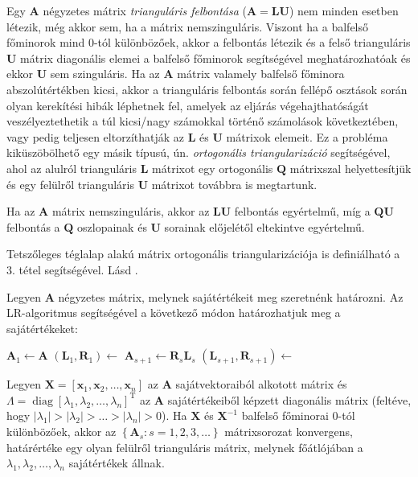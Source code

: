 \documentclass[DIV=15,appendixprefix]{scrreprt}
\theoremstyle{definition}
\theoremstyle{remark}
\DeclareMathOperator{\T}{T}
\DeclareMathOperator{\diag}{diag}
\begin{document}
Egy $ \mathbf{ A } $ négyzetes mátrix \emph{trianguláris felbontása} ($ \mathbf{ A } = \mathbf{ L }
\mathbf{ U } $) nem minden esetben létezik, még akkor sem, ha a mátrix nemszinguláris. Viszont ha a
balfelső főminorok mind 0-tól különbözőek, akkor a felbontás létezik és a felső trianguláris
$ \mathbf{ U } $ mátrix diagonális elemei a balfelső főminorok segítségével meghatározhatóak és
ekkor $ \mathbf{ U } $ sem szinguláris. Ha az $ \mathbf{ A } $ mátrix valamely balfelső főminora
abszolútértékben kicsi, akkor a trianguláris felbontás során fellépő osztások során olyan kerekítési
hibák léphetnek fel, amelyek az eljárás végehajthatóságát veszélyeztethetik a túl kicsi/nagy
számokkal történő számolások következtében, vagy pedig teljesen eltorzíthatják az $ \mathbf{ L } $
és $ \mathbf{ U } $ mátrixok elemeit. Ez a probléma kiküszöbölhető egy másik típusú, ún.
\emph{ortogonális triangularizáció} segítségével, ahol az alulról trianguláris $ \mathbf{ L } $
mátrixot egy ortogonális $ \mathbf{ Q } $ mátrixszal helyettesítjük és egy felülről trianguláris
$ \mathbf{ U } $ mátrixot továbbra is megtartunk.

Ha az $ \mathbf{ A } $ mátrix nemszinguláris, akkor az $ \mathbf{ L } \mathbf{ U } $ felbontás
egyértelmű, míg a $ \mathbf{ Q } \mathbf{ U } $ felbontás a $ \mathbf{ Q } $ oszlopainak és
$ \mathbf{ U } $ sorainak előjelétől eltekintve egyértelmű.

Tetszőleges téglalap alakú mátrix ortogonális triangularizációja is definiálható a 3. tétel
segítségével.
%
Lásd \cite[I. fejezet, 3. szakasz]{Moricz1997}.

Legyen $ \mathbf{ A } $ négyzetes mátrix, melynek sajátértékeit meg szeretnénk határozni. Az
LR-algoritmus segítségével a következő módon határozhatjuk meg a sajátértékeket:
\begin{algorithmic}[1]
	\State $ \mathbf{ A }_{ 1 } \gets \mathbf{ A }$
	\State $ \left( \mathbf{ L }_{ 1 },{} \mathbf{ R }_{ 1 } \right) \gets $
		\State $ \mathbf{ A }_{ s + 1 } \gets \mathbf{ R }_{ s } \mathbf{ L }_{ s } $
		\State $ \left( \mathbf{ L }_{ s + 1 },{} \mathbf{ R }_{ s + 1 } \right) \gets $ 
	\EndFor
\end{algorithmic}

Legyen $ \mathbf{ X } = \left[ \mathbf{ x }_{ 1 },{} \mathbf{ x }_{ 2 }, \ldots,{}
\mathbf{ x }_{ n } \right] $ az $ \mathbf{ A } $ sajátvektoraiból alkotott mátrix és $ \Lambda =
\diag \left[ \lambda_{ 1 },{} \lambda_{ 2 },{} \ldots,{} \lambda_{ n } \right]^{ \T } $ az
$ \mathbf{ A } $ sajátértékeiből képzett diagonális mátrix (feltéve, hogy $ \left| \lambda_{ 1 }
\right| > \left| \lambda_{ 2 } \right| > \ldots > \left| \lambda_{ n } \right| > 0 $). Ha
$ \mathbf{ X } $ és $ \mathbf{ X }^{ - 1 } $ balfelső főminorai 0-tól különbözőek, akkor az
$ \left\{ \mathbf{ A }_{ s } \colon s = 1,{} 2,{} 3,{} \ldots \right\} $ mátrixsorozat konvergens,
határértéke egy olyan felülről trianguláris mátrix, melynek főátlójában a $ \lambda_{ 1 },{}
\lambda_{ 2 },{} \ldots,{} \lambda_{ n } $ sajátértékek állnak.
\end{document}
